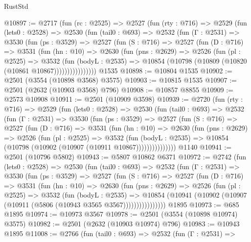 \begin{lexlean}{RustStd}
\begin{coremodule}
{\begin{coremodule}
{{{{{{{{{{{{{{{{{{{{@10897 := @2717
    (fun (rc : @2525) =>
    @2527
      (fun (rty : @716) =>
      @2529
        (fun (lets0 : @2528) =>
        @2530
          (fun (tail0 : @693) =>
          @2532
            (fun (Γ : @2531) =>
            @3530
              (fun (ps : @3529) =>
              @2527
                (fun (S : @716) =>
                @2527
                  (fun (D : @716) =>
                  @3531
                    (fun (hn : @10) =>
                    @2630
                      (fun (pns : @2629) =>
                      @2526
                        (fun (pl : @2525) =>
                        @3532
                          (fun (bodyL : @2535) =>
                          @10854 (@10798 (@10809 (@10820 (@10861 @10867))))))))))))))))
    @1535
@10898 := @10804 @1535
@10902 := @2501 (@3554 (@10898 @3568) @3575)
@10903 := @10815 @1535
@10907 := @2501 (@2632 (@10903 @3568) @796)
@10908 := @10857 @8855
@10909 := @2573 @10908
@10911 := @2501 (@10909 @3598)
@10939 := @2720
    (fun (rty : @716) =>
    @2529
      (fun (lets0 : @2528) =>
      @2530
        (fun (tail0 : @693) =>
        @2532
          (fun (Γ : @2531) =>
          @3530
            (fun (ps : @3529) =>
            @2527
              (fun (S : @716) =>
              @2527
                (fun (D : @716) =>
                @3531
                  (fun (hn : @10) =>
                  @2630
                    (fun (pns : @2629) =>
                    @2526
                      (fun (pl : @2525) =>
                      @3532
                        (fun (bodyL : @2535) =>
                        @10854 (@10798 (@10902 (@10907 (@10911 @10867)))))))))))))))
    @1140
@10941 := @2501 (@10796 @5802)
@10943 := @5807 @10862 @6371
@10972 := @2742
    (fun (lets0 : @2528) =>
    @2530
      (fun (tail0 : @693) =>
      @2532
        (fun (Γ : @2531) =>
        @3530
          (fun (ps : @3529) =>
          @2527
            (fun (S : @716) =>
            @2527
              (fun (D : @716) =>
              @3531
                (fun (hn : @10) =>
                @2630
                  (fun (pns : @2629) =>
                  @2526
                    (fun (pl : @2525) =>
                    @3532
                      (fun (bodyL : @2535) =>
                      @10854
                        (@10941 (@10902 (@10907 (@10911 (@5806 (@10943 @3565 @3567))))))))))))))))
    @1895
@10973 := @685 @1895
@10974 := @10973 @3567
@10978 := @2501 (@3554 (@10898 @10974) @3575)
@10982 := @2501 (@2632 (@10903 @10974) @796)
@10983 := @10943 @1895
@11008 := @2766
    (fun (tail0 : @693) =>
    @2532
      (fun (Γ : @2531) =>
}}}}}}}}}}}}}}}}}}}}
\end{coremodule}}
\end{coremodule}
\end{lexlean}
